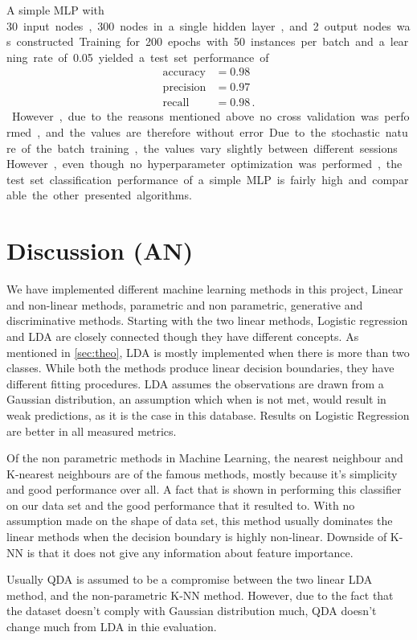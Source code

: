 \documentclass[12pt, a4paper]{scrartcl}
\begin{document}
A simple MLP with \SI{30} input nodes, \SI{300} nodes in a single hidden layer, and \SI{2} output nodes was constructed. Training for \SI{200} epochs with \SI{50} instances per batch and a learning rate of \SI{0.05} yielded a test set performance of 
\begin{align*}
	\text{accuracy} &= 0.98 \\
	\text{precision} &= 0.97  \\
	\text{recall} &= 0.98  \, .
\end{align*}
However, due to the reasons mentioned above no cross validation was performed, and the values are therefore without error. Due to the stochastic nature of the batch training, the values vary slightly between different sessions. However, even though no hyperparameter optimization was performed, the test set classification performance of a simple MLP is fairly high and comparable the other presented algorithms.

\section{Discussion (AN)}
 \label{sec:discu}

We have implemented different machine learning methods in this project, Linear and non-linear methods, parametric and non parametric, generative and discriminative methods. Starting with the two linear methods, Logistic regression and LDA are closely connected though they have different concepts. As mentioned in \cref{sec:theo}, LDA is mostly implemented when there is more than two classes. While both the methods produce linear decision boundaries, they have different fitting procedures. LDA assumes the observations are drawn from a Gaussian distribution, an assumption which when is not met, would result in weak predictions, as it is the case in this database. Results on Logistic Regression are better in all measured metrics. 

Of the non parametric methods in Machine Learning, the nearest neighbour and K-nearest neighbours are of the famous methods, mostly because it's simplicity and good performance over all. A fact that is shown in performing this classifier on our data set and the good performance that it resulted to. With no assumption made on the shape of data set, this method usually dominates the linear methods when the decision boundary is highly non-linear. Downside of K-NN is that it does not give any information about feature importance. 

Usually QDA is assumed to be a compromise between the two linear LDA method, and the non-parametric K-NN method. However, due to the fact that the dataset doesn't comply with Gaussian distribution much, QDA doesn't change much from LDA in thie evaluation.
\end{document}
